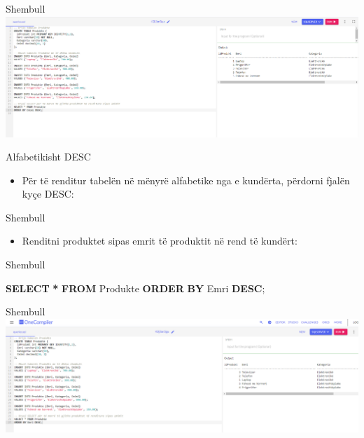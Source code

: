\documentclass[
  ignorenonframetext,
]{beamer}
\newenvironment{Shaded}{\begin{snugshade}}{\end{snugshade}}
\newcommand{\KeywordTok}[1]{\textcolor[rgb]{0.13,0.29,0.53}{\textbf{#1}}}
\newcommand{\NormalTok}[1]{#1}
\newcommand{\OperatorTok}[1]{\textcolor[rgb]{0.81,0.36,0.00}{\textbf{#1}}}
\providecommand{\tightlist}{%
  \setlength{\itemsep}{0pt}\setlength{\parskip}{0pt}}
\begin{document}
\begin{frame}{Shembull}
\label{shembull-13}
\includegraphics{./Figs/query10.png}
\end{frame}

\begin{frame}{Alfabetikisht DESC}
\label{alfabetikisht-desc}
\begin{itemize}
\tightlist
\item
  Për të renditur tabelën në mënyrë alfabetike nga e kundërta, përdorni
  fjalën kyçe DESC:
\end{itemize}
\end{frame}

\begin{frame}{Shembull}
\label{shembull-14}
\begin{itemize}
\tightlist
\item
  Renditni produktet sipas emrit të produktit në rend të kundërt:
\end{itemize}
\end{frame}

\begin{frame}[fragile]{Shembull}
\label{shembull-15}
\begin{Shaded}
\begin{Highlighting}[]
\KeywordTok{SELECT} \OperatorTok{*} \KeywordTok{FROM}\NormalTok{ Produkte}
\KeywordTok{ORDER} \KeywordTok{BY}\NormalTok{ Emri }\KeywordTok{DESC}\NormalTok{;}
\end{Highlighting}
\end{Shaded}
\end{frame}

\begin{frame}{Shembull}
\label{shembull-16}
\includegraphics{./Figs/query11.png}
\end{frame}
\end{document}
